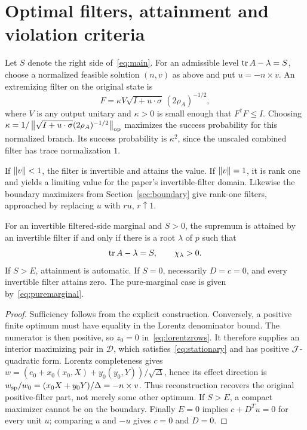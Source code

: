 \section{Optimal filters, attainment and violation criteria}
\label{sec:attainment}

Let $S$ denote the right side of~\eqref{eq:main}. For an admissible level $\operatorname{tr} A-\lambda=S$, choose a normalized feasible solution $(n,v)$ as above and put $u=-n\times v$. An extremizing filter on the original state is
\begin{equation}
 \boxed{F=\kappa V\sqrt{I+u\cdot\sigma}\,(2\rho_A)^{-1/2},}
 \label{eq:finalfilter}
\end{equation}
where $V$ is any output unitary and $\kappa>0$ is small enough that $F^\dagger F\le I$. Choosing
$\kappa=1/\left\lVert\sqrt{I+u\cdot\sigma}(2\rho_A)^{-1/2}\right\rVert_{\rm op}$ maximizes the success probability for this normalized branch. Its success probability is $\kappa^2$, since the unscaled combined filter has trace normalization $1$.

If $\left\lVert v\right\rVert<1$, the filter is invertible and attains the value. If $\left\lVert v\right\rVert=1$, it is rank one and yields a limiting value for the paper's invertible-filter domain. Likewise the boundary maximizers from Section~\ref{sec:boundary} give rank-one filters, approached by replacing $u$ with $ru$, $r\uparrow1$.

\begin{corollary}
For an invertible filtered-side marginal and $S>0$, the supremum is attained by an invertible filter if and only if there is a root $\lambda$ of $p$ such that
\begin{equation}
 \operatorname{tr} A-\lambda=S,\qquad \chi_\lambda>0.
 \label{eq:attainment}
\end{equation}
If $S>E$, attainment is automatic. If $S=0$, necessarily $D=c=0$, and every invertible filter attains zero. The pure-marginal case is given by~\eqref{eq:puremarginal}.
\end{corollary}
\begin{proof}
Sufficiency follows from the explicit construction. Conversely, a positive finite optimum must have equality in the Lorentz denominator bound. The numerator is then positive, so $z_0=0$ in~\eqref{eq:lorentzrows}. It therefore supplies an interior maximizing pair in $\mathcal D$, which satisfies~\eqref{eq:stationary} and has positive $\mathcal J$-quadratic form. Lorentz completeness gives
$w=(e_0+x_0(x_0,X)+y_0(y_0,Y))/\sqrt\Delta$, hence its effect direction is
$w_{\rm sp}/w_0=(x_0X+y_0Y)/\Delta=-n\times v$. Thus reconstruction recovers the original positive-filter part, not merely some other optimum. If $S>E$, a compact maximizer cannot be on the boundary. Finally $E=0$ implies $c+D^Tu=0$ for every unit $u$; comparing $u$ and $-u$ gives $c=0$ and $D=0$.
\end{proof}


